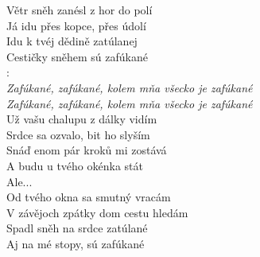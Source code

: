 
Větr sněh zanésl z hor do polí\\
Já idu přes kopce, přes údolí\\
Idu k tvéj dědině zatúlanej\\
Cestičky sněhem sú zafúkané \hspace{0.6cm}  \hspace{1.7cm}  \hspace{1.1cm} \\

\textregistered:\\
\emph{
Zafúkané, zafúkané, kolem mňa všecko je zafúkané\\
Zafúkané, zafúkané, kolem mňa všecko je zafúkané}\\

Už vašu chalupu z dálky vidím\\
Srdce sa ozvalo, bit ho slyším\\
Snáď enom pár kroků mi zostává\\
A budu u tvého okénka stát\\

Ale... \textregistered\\

Od tvého okna sa smutný vracám\\
V závějoch zpátky dom cestu hledám\\
Spadl sněh na srdce zatúlané\\
Aj na mé stopy, sú zafúkané\\

\textregistered

\newpage
